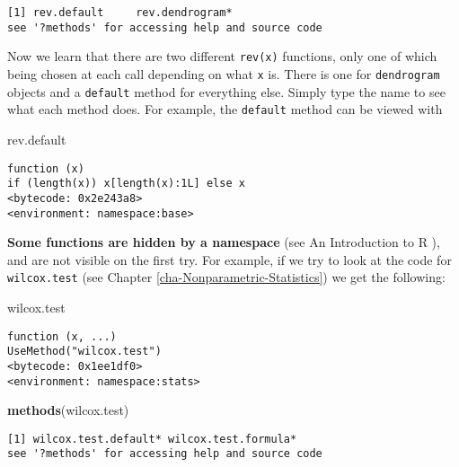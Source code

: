 \documentclass[]{book}
\newenvironment{Shaded}{\begin{snugshade}}{\end{snugshade}}
\newcommand{\KeywordTok}[1]{\textcolor[rgb]{0.13,0.29,0.53}{\textbf{{#1}}}}
\newcommand{\NormalTok}[1]{{#1}}
\numberwithin{equation}{chapter}
\numberwithin{figure}{chapter}
\theoremstyle{plain}
\theoremstyle{definition}
\theoremstyle{remark}
\theoremstyle{definition}
\theoremstyle{definition}
\theoremstyle{remark}
\begin{document}
\begin{verbatim}
[1] rev.default     rev.dendrogram*
see '?methods' for accessing help and source code
\end{verbatim}

Now we learn that there are two different \texttt{rev(x)} functions,
only one of which being chosen at each call depending on what \texttt{x}
is. There is one for \texttt{dendrogram} objects and a \texttt{default}
method for everything else. Simply type the name to see what each method
does. For example, the \texttt{default} method can be viewed with

\begin{Shaded}
\begin{Highlighting}[]
\NormalTok{rev.default}
\end{Highlighting}
\end{Shaded}

\begin{verbatim}
function (x) 
if (length(x)) x[length(x):1L] else x
<bytecode: 0x2e243a8>
<environment: namespace:base>
\end{verbatim}

\textbf{Some functions are hidden by a namespace} (see An Introduction
to R \textcite{Venables2010}), and are not visible on the first try. For
example, if we try to look at the code for \texttt{wilcox.test}
 (see Chapter
\ref{cha-Nonparametric-Statistics}) we get the following:

\begin{Shaded}
\begin{Highlighting}[]
\NormalTok{wilcox.test}
\end{Highlighting}
\end{Shaded}

\begin{verbatim}
function (x, ...) 
UseMethod("wilcox.test")
<bytecode: 0x1ee1df0>
<environment: namespace:stats>
\end{verbatim}

\begin{Shaded}
\begin{Highlighting}[]
\KeywordTok{methods}\NormalTok{(wilcox.test)}
\end{Highlighting}
\end{Shaded}

\begin{verbatim}
[1] wilcox.test.default* wilcox.test.formula*
see '?methods' for accessing help and source code
\end{verbatim}
\end{document}
